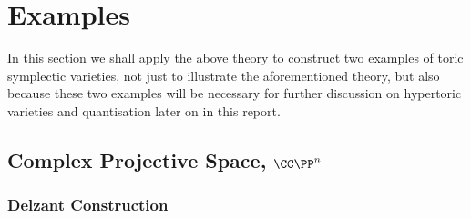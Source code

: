 
\chapter{Examples}

In this section we shall apply the above theory to construct two examples of toric symplectic varieties, not just to illustrate the aforementioned theory, but also because these two examples will be necessary for further discussion on hypertoric varieties and quantisation later on in this report.

\section{Complex Projective Space, $\CC\PP^{n}$}

\subsection{Delzant Construction}

